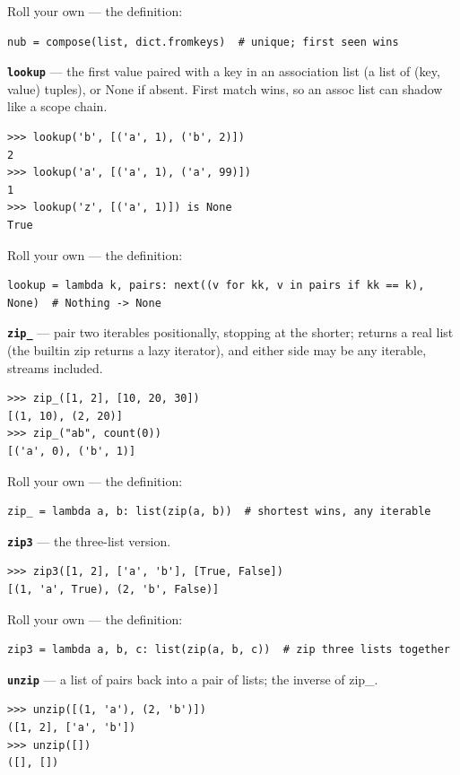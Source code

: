 \documentclass[10pt,letterpaper]{article}
\begin{document}
Roll your own --- the definition:

\begin{lstlisting}[style=ex]
nub = compose(list, dict.fromkeys)  # unique; first seen wins
\end{lstlisting}
\textbf{\texttt{lookup}} --- the first value paired with a key in an association list (a list of (key, value) tuples), or None if absent. First match wins, so an assoc list can shadow like a scope chain.
\begin{lstlisting}[style=ex]
>>> lookup('b', [('a', 1), ('b', 2)])
2
>>> lookup('a', [('a', 1), ('a', 99)])
1
>>> lookup('z', [('a', 1)]) is None
True
\end{lstlisting}

Roll your own --- the definition:

\begin{lstlisting}[style=ex]
lookup = lambda k, pairs: next((v for kk, v in pairs if kk == k), None)  # Nothing -> None
\end{lstlisting}
\textbf{\texttt{zip\_}} --- pair two iterables positionally, stopping at the shorter; returns a real list (the builtin zip returns a lazy iterator), and either side may be any iterable, streams included.
\begin{lstlisting}[style=ex]
>>> zip_([1, 2], [10, 20, 30])
[(1, 10), (2, 20)]
>>> zip_("ab", count(0))
[('a', 0), ('b', 1)]
\end{lstlisting}

Roll your own --- the definition:

\begin{lstlisting}[style=ex]
zip_ = lambda a, b: list(zip(a, b))  # shortest wins, any iterable
\end{lstlisting}
\textbf{\texttt{zip3}} --- the three-list version.
\begin{lstlisting}[style=ex]
>>> zip3([1, 2], ['a', 'b'], [True, False])
[(1, 'a', True), (2, 'b', False)]
\end{lstlisting}

Roll your own --- the definition:

\begin{lstlisting}[style=ex]
zip3 = lambda a, b, c: list(zip(a, b, c))  # zip three lists together
\end{lstlisting}
\textbf{\texttt{unzip}} --- a list of pairs back into a pair of lists; the inverse of zip\_.
\begin{lstlisting}[style=ex]
>>> unzip([(1, 'a'), (2, 'b')])
([1, 2], ['a', 'b'])
>>> unzip([])
([], [])
\end{lstlisting}
\end{document}
